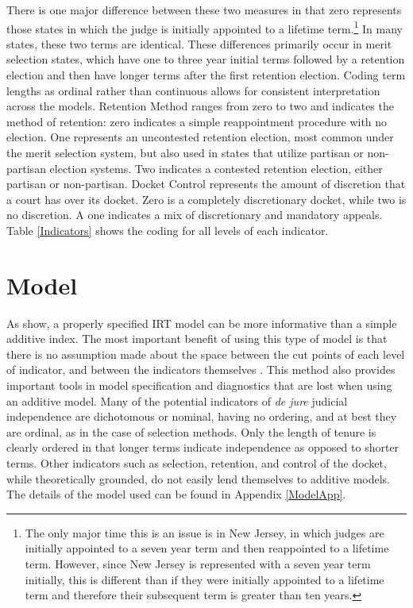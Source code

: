 \documentclass[12pt]{article}
\begin{document}
There is one major difference between these two measures in that zero represents those states in which the judge is initially appointed to a lifetime term.\footnote{The only major time this is an issue is in New Jersey, in which judges are initially appointed to a seven year term and then reappointed to a lifetime term.  However, since New Jersey is represented with a seven year term initially, this is different than if they were initially appointed to a lifetime term and therefore their subsequent term is greater than ten years.}  In many states, these two terms are identical.  These differences primarily occur in merit selection states, which have one to three year initial terms followed by a retention election and then have longer terms after the first retention election.  Coding term lengths as ordinal rather than continuous allows for consistent interpretation across the models.  Retention Method ranges from zero to two and indicates the method of retention: zero indicates a simple reappointment procedure with no election.  One represents an uncontested retention election, most common under the merit selection system, but also used in states that utilize partisan or non-partisan election systems.  Two indicates a contested retention election, either partisan or non-partisan.  Docket Control represents the amount of discretion that a court has over its docket.  Zero is a completely discretionary docket, while two is no discretion.  A one indicates a mix of discretionary and mandatory appeals. Table \ref{Indicators} shows the coding for all levels of each indicator. 

\section{Model}\label{Model}
As \citet{Linzer2014} show, a  properly specified IRT model can be more informative than a simple additive index.  The most important benefit of using this type of model is that there is no assumption made about the space between the cut points of each level of indicator, and between the indicators themselves \citep{Jackman2008,Schnakenberg2014}.  This method also provides important tools in model specification and diagnostics that are lost when using an additive model.  Many of the potential indicators of \textit{de jure} judicial independence are dichotomous or nominal, having no ordering, and at best they are ordinal, as in the case of selection methods.  Only the length of tenure is clearly ordered in that longer terms indicate independence as opposed to shorter terms.  Other indicators such as selection, retention, and control of the docket, while theoretically grounded, do not easily lend themselves to additive models.  The details of the model used can be found in Appendix \ref{ModelApp}. 
\end{document}
